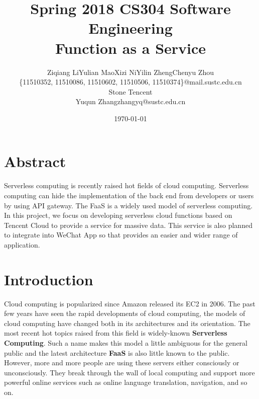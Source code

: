 \documentclass[a4paper,12pt]{article}
\begin{document}

\title{Spring 2018 CS304 Software Engineering\\Function as a Service}
\author{Ziqiang Li\quad Yulian Mao\quad Xizi Ni\quad Yilin Zheng\quad Chenyu Zhou\\
\small \{11510352, 11510086, 11510602, 11510506, 11510374\}@mail.sustc.edu.cn\\
Stone Tencent\\
Yuqun Zhang\quad zhangyq@sustc.edu.cn}
\date{\today}



\maketitle


\section{Abstract}
Serverless computing is recently raised hot fields of cloud computing. Serverless computing can hide the implementation of the back end from developers or users by using API gateway. The FaaS is a widely used model of serverless computing. In this project, we focus on developing serverless cloud functions based on Tencent Cloud to provide a service for massive data. This service is also planned to integrate into WeChat App so that provides an easier and wider range of application.  

\section{Introduction}
Cloud computing is popularized since Amazon released its EC2 in 2006. The past few years have seen the rapid developments of cloud computing, the models of cloud computing have changed both in its architectures and its orientation. The most recent hot topics raised from this field is widely-known \textbf{Serverless Computing}. Such a name makes this model a little ambiguous for the general public and the latest architecture \textbf{FaaS} is also little known to the public. However, more and more people are using these servers either consciously or unconsciously. They break through the wall of local computing and support more powerful online services such as online language translation, navigation, and so on.
\end{document}
